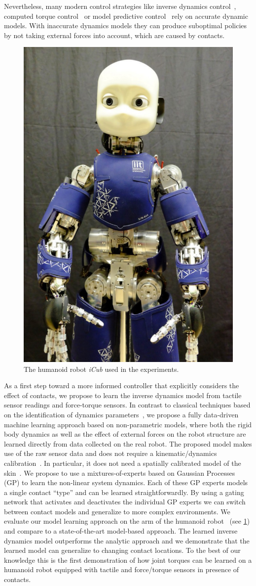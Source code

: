 Nevertheless, many modern control strategies like inverse dynamics
control~\cite{Erez2012}, computed torque control~\cite{Siciliano2009} or model
predictive control~\cite{Naveau2014} rely on accurate dynamic models. With
inaccurate dynamics models they can produce suboptimal policies by not taking
external forces  into account, which are caused by contacts.

\begin{figure}
\begin{center}
\includegraphics[width=0.29\columnwidth]{robertoICRA/fig/iCubDarmstadt}
\end{center}
\caption{The humanoid robot \textit{iCub} used in the experiments.}
\label{fig:icub}
\end{figure}

As a first step toward a more informed controller that explicitly considers the
effect of contacts, we propose to learn the inverse dynamics model from tactile
sensor readings and force-torque sensors. In contrast to classical techniques
based on the identification of dynamics
parameters~\cite{Yamane2011calibration,Ogawa2014,traversaro2013inertial}, we
propose a fully data-driven machine learning approach based on non-parametric
models, where both the rigid body dynamics as well as the effect of external
forces on the robot structure are learned directly from data collected on the
real robot. The proposed model makes use of the raw sensor data and does not
require a kinematic/dynamics
calibration~\cite{Yamane2011calibration,Ogawa2014,traversaro2013inertial}. In
particular, it does not need a spatially calibrated model of the
skin~\cite{DelPrete2011}. We propose to use a mixtures-of-experts based on
Gaussian Processes (GP) to learn the non-linear system dynamics. Each of these
GP experts models a single contact ``type'' and can be learned
straightforwardly. By using a gating network that activates and deactivates the
individual GP experts we can switch between contact models and generalize to
more complex environments. We evaluate our model learning approach on the arm of
the \robot{} humanoid robot~\cite{Natale2013} (see \fig\ref{fig:icub}) and
compare to a state-of-the-art model-based approach. The learned inverse dynamics
model outperforms the analytic approach and we demonstrate that the learned
model can generalize to changing contact locations. To the best of our knowledge
this is the first demonstration of how joint torques can be learned on a
humanoid robot equipped with tactile and force/torque sensors in presence of
contacts.

